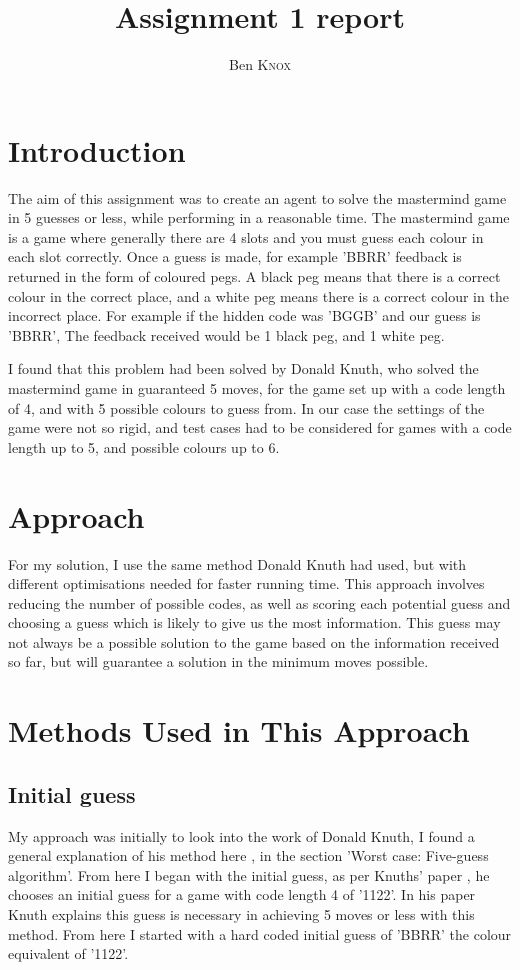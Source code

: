 \documentclass[12pt]{article}
\title{Assignment 1 report}
\author{Ben \textsc{Knox}}
\begin{document}
\maketitle


\section{Introduction}
 
The aim of this assignment was to create an agent to solve the mastermind game in 5 guesses or less, while performing in a reasonable time. The mastermind game is a game where generally there are 4 slots and you must guess each colour in each slot correctly. Once a guess is made, for example 'BBRR' feedback is returned in the form of coloured pegs. A black peg means that there is a correct colour in the correct place, and a white peg means there is a correct colour in the incorrect place. For example if the hidden code was 'BGGB' and our guess is 'BBRR', The feedback received would be 1 black peg, and 1 white peg. 

I found that this problem had been solved by Donald Knuth, who solved the mastermind game in guaranteed 5 moves, for the game set up with a code length of 4, and with 5 possible colours to guess from. In our case the settings of the game were not so rigid, and test cases had to be considered for games with a code length up to 5, and possible colours up to 6.  

\section{Approach}

For my solution, I use the same method Donald Knuth had used, but with different optimisations needed for faster running time. This approach involves reducing the number of possible codes, as well as scoring each potential guess and choosing a guess which is likely to give us the most information. This guess may not always be a possible solution to the game based on the information received so far, but will guarantee a solution in the minimum moves possible.

\section{Methods Used in This Approach}
 
\subsection{Initial guess}
My approach was initially to look into the work of Donald Knuth, I found a general explanation of his method here \cite{mastermind wikipedia}, in the section 'Worst case: Five-guess algorithm'. From here I began with the initial guess, as per Knuths' paper \cite{Knuths Paper}, he chooses an initial guess for a game with code length 4 of '1122'. In his paper Knuth explains this guess is necessary in achieving 5 moves or less with this method. From here I started with a hard coded initial guess of 'BBRR' the colour equivalent of '1122'. 
\end{document}
